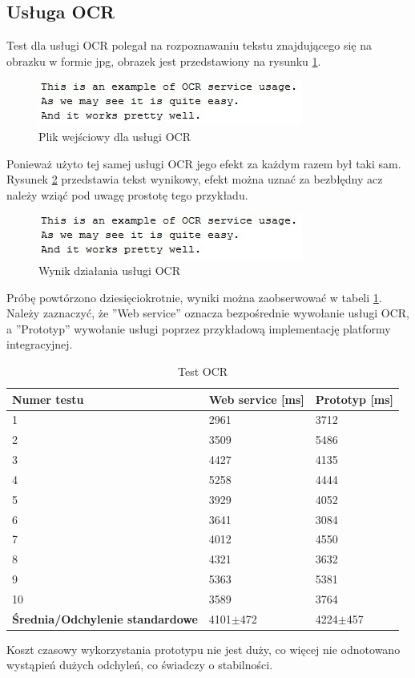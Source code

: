 \subsection{Usługa OCR}
Test dla usługi OCR polegał na rozpoznawaniu tekstu znajdującego się na obrazku w formie jpg, obrazek jest przedstawiony na rysunku \ref{fig:OCRExample}. 
\begin{figure}[!h]
\centering
\includegraphics[scale=0.9]{OCRExample.jpg}
\caption{Plik wejściowy dla usługi OCR}\label{fig:OCRExample}
\end{figure}
\newpage
Ponieważ użyto tej samej usługi OCR jego efekt za każdym razem był taki sam. Rysunek \ref{fig:OCRResult} przedstawia tekst wynikowy, efekt można uznać za bezbłędny acz należy wziąć pod uwagę prostotę tego przykładu.
\begin{figure}[!h]
\centering
\includegraphics[scale=0.9]{OCRExample.jpg}
\caption{Wynik działania usługi OCR}\label{fig:OCRResult}
\end{figure}

Próbę powtórzono dziesięciokrotnie, wyniki można zaobserwować w tabeli \ref{tab:ocr}. Należy zaznaczyć, że ''Web service'' oznacza bezpośrednie wywołanie usługi OCR, a ''Prototyp'' wywołanie usługi poprzez przykładową implementację platformy integracyjnej.
\begin{center}
	\begin{table}[h]
	\centering
	\begin{tabular}{| l | l | l |}	
		\hline
		\textbf{Numer testu} & \textbf{Web service [ms]} & \textbf{Prototyp [ms]} \\ \hline
		1 & 2961 & 3712\\ \hline
		2 & 3509 & 5486\\ \hline
		3 & 4427 & 4135\\ \hline
		4 & 5258 & 4444\\ \hline
		5 & 3929 & 4052\\ \hline
		6 & 3641 & 3084\\ \hline
		7 & 4012 & 4550\\ \hline
		8 & 4321 & 3632\\ \hline
		9 & 5363 & 5381\\ \hline
		10 & 3589 & 3764\\ \hline
		\textbf{Średnia/Odchylenie standardowe} & 4101$\pm$472 & 4224$\pm$457\\ 
		\hline
	\end{tabular}
	\caption{Test OCR}
	\label{tab:ocr}
	\end{table}
\end{center}
Koszt czasowy wykorzystania prototypu nie jest duży, co więcej nie odnotowano wystąpień dużych odchyleń, co świadczy o stabilności. 

